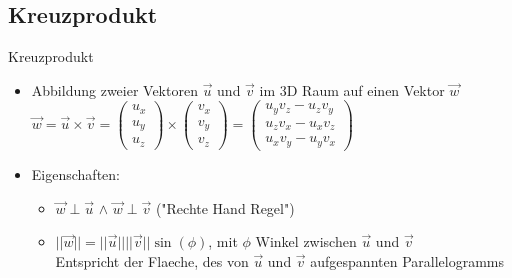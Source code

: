 \documentclass[10pt,aspectratio=169]{beamer}
\begin{document}
  \subsection{Kreuzprodukt}
  \begin{frame}{Kreuzprodukt}
    \begin{minipage}{10cm}
      \begin{itemize}
        \item Abbildung zweier Vektoren $\vec{u}$ und $\vec{v}$ im 3D Raum auf einen Vektor $\vec{w}$\\\vspace{0.25cm}
        \hspace{0.3cm}$\vec{w} = \vec{u} \times \vec{v} = \begin{pmatrix}u_x\\ u_y\\u_z\end{pmatrix} \times \begin{pmatrix}v_x\\v_y\\v_z\end{pmatrix} = \begin{pmatrix}u_yv_z - u_zv_y\\u_zv_x - u_xv_z\\u_xv_y - u_yv_x\end{pmatrix}$ 
        \vspace{0.25cm}
        \item Eigenschaften:
        \begin{itemize}
          \item $\vec{w} \perp \vec{u}$ \hspace{0.1cm}$\wedge$\hspace{0.1cm} $\vec{w} \perp \vec{v}$ ("Rechte Hand Regel")
          \item $||\vec{w}|| = ||\vec{u}||||\vec{v}||\sin(\phi)$, mit $\phi$ Winkel zwischen $\vec{u}$ und $\vec{v}$\\
          Entspricht der Flaeche, des von $\vec{u}$ und $\vec{v}$ aufgespannten Parallelogramms
        \end{itemize}
      \end{itemize}  
    \end{minipage}
    \begin{minipage}{3cm}
    \end{minipage}
  \end{frame}
\end{document}
